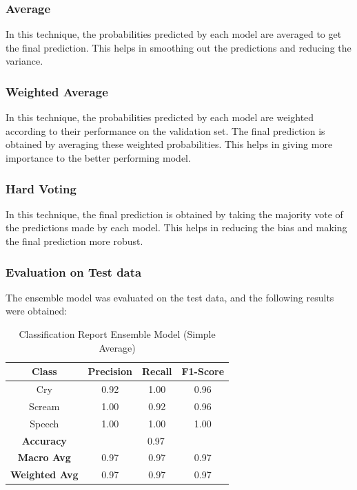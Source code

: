 \documentclass[conference]{IEEEtran}
\begin{document}
\subsubsection{Average}
In this technique, the probabilities predicted by each model are averaged to get the final prediction. This helps in smoothing out the predictions and reducing the variance.

\subsubsection{Weighted Average}
In this technique, the probabilities predicted by each model are weighted according to their performance on the validation set. The final prediction is obtained by averaging these weighted probabilities. This helps in giving more importance to the better performing model.

\subsubsection{Hard Voting}
In this technique, the final prediction is obtained by taking the majority vote of the predictions made by each model. This helps in reducing the bias and making the final prediction more robust.

\subsubsection*{Evaluation on Test data}
The ensemble model was evaluated on the test data, and the following results were obtained:

\begin{table}[htbp]
\caption{Classification Report Ensemble Model (Simple Average)}
\begin{center}
\begin{tabular}{|c|c|c|c|}
\hline
\textbf{Class} & \textbf{Precision} & \textbf{Recall} & \textbf{F1-Score} \\
\hline
Cry & 0.92 & 1.00 & 0.96 \\
\hline
Scream & 1.00 & 0.92 & 0.96 \\
\hline
Speech & 1.00 & 1.00 & 1.00 \\
\hline
\textbf{Accuracy} & \multicolumn{3}{|c|}{0.97} \\
\hline
\textbf{Macro Avg} & 0.97 & 0.97 & 0.97 \\
\hline
\textbf{Weighted Avg} & 0.97 & 0.97 & 0.97 \\
\hline
\end{tabular}
\label{tab:classification_report_ensemble}
\end{center}
\end{table}
\end{document}
